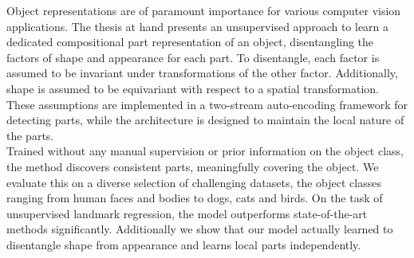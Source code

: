   Object representations are of paramount importance for various computer vision applications. %
  The thesis at hand presents an unsupervised approach to learn a dedicated compositional part representation of an object, disentangling the factors of shape and appearance for each part. %
  To disentangle, each factor is assumed to be invariant under transformations of the other factor. Additionally, shape is assumed to be equivariant with respect to a spatial transformation. These assumptions are implemented in a two-stream auto-encoding framework for detecting parts, while the architecture is designed to maintain the local nature of the parts.\\
  Trained without any manual supervision or prior information on the object class, the method discovers consistent parts, meaningfully covering the object. We evaluate this on a diverse selection of challenging datasets, the object classes ranging from human faces and bodies to dogs, cats and birds.
  On the task of unsupervised landmark regression, the model outperforms state-of-the-art methods significantly.
  Additionally we show that our model actually learned to disentangle shape from appearance and learns local parts independently.



